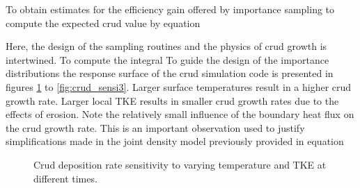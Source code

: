 To obtain estimates for the efficiency gain offered by importance sampling to compute the expected crud value by equation %

Here, the design of the sampling routines and the physics of crud growth is intertwined.  To compute the integral %
To guide the design of the importance distributions the response surface of the crud simulation code is presented in figures \ref{fig:crud_sensi1} to \ref{fig:crud_sensi3}.  Larger surface temperatures result in a higher crud growth rate.  Larger local TKE results in smaller crud growth rates due to the effects of erosion.  Note the relatively small influence of the boundary heat flux on the crud growth rate.  This is an important observation used to justify simplifications made in the joint density model previously provided in equation %

\begin{figure}[H]%
    \captionsetup[subfigure]{justification=centering}
    \centering
    \hspace*{-1.0em}%
    \caption[Crud marginal response to varying temperature and TKE at different times.]{Crud deposition rate sensitivity to varying temperature and TKE at different times.}%
    \label{fig:crud_sensi1}%
\end{figure}

